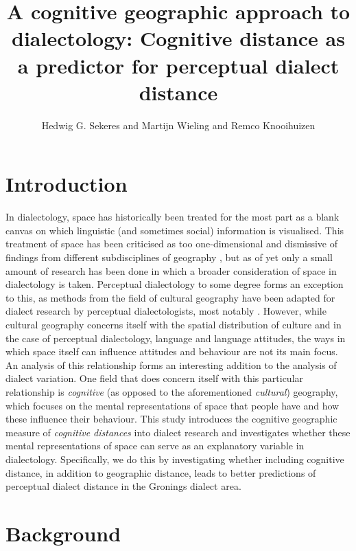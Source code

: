 \documentclass[output=paper,colorlinks,citecolor=brown,draft]{langscibook}
\author{Hedwig G. Sekeres\orcid{0000-0003-0213-0805}\affiliation{University of Groningen} and Martijn Wieling\orcid{0000-0003-0434-1526}\affiliation{University of Groningen} and Remco Knooihuizen\orcid{0000-0002-2885-6359}\affiliation{University of Groningen}}
\title{A cognitive geographic approach to dialectology: Cognitive distance as a predictor for perceptual dialect distance}
\begin{document}
\graphicspath{{figures/sekeres}}
\maketitle
\label{chap:sekeres}

\section{Introduction}
In dialectology, space has historically been treated for the most part as a blank canvas on which linguistic (and sometimes social) information is visualised. This treatment of space has been criticised as too one-dimensional and dismissive of findings from different subdisciplines of geography \citep[e.g.,][]{britain_space_2013}, but as of yet only a small amount of research has been done in which a broader consideration of space in dialectology is taken. Perceptual dialectology to some degree forms an exception to this, as methods from the field of cultural geography have been adapted for dialect research by perceptual dialectologists, most notably \citet[e.g.,][]{preston_perceptual_1981, preston_handbook_1999}. However, while cultural geography concerns itself with the spatial distribution of culture \citep{anderson_handbook_2003} and in the case of perceptual dialectology, language and language attitudes, the ways in which space itself can influence attitudes and behaviour are not its main focus. An analysis of this relationship forms an interesting addition to the analysis of dialect variation. One field that does concern itself with this particular relationship is \textit{cognitive} (as opposed to the aforementioned \textit{cultural}) geography, which focuses on the mental representations of space that people have and how these influence their behaviour. This study introduces the cognitive geographic measure of \textit{cognitive distances} into dialect research and investigates whether these mental representations of space can serve as an explanatory variable in dialectology. Specifically, we do this by investigating whether including cognitive distance, in addition to geographic distance, leads to better predictions of perceptual dialect distance in the Gronings dialect area.

\section{Background}
\end{document}
